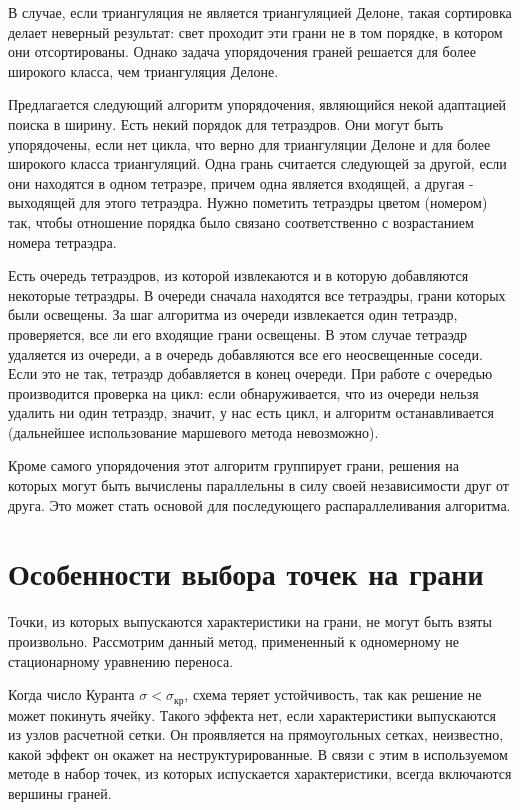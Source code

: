 В случае, если триангуляция не является триангуляцией Делоне, такая сортировка делает неверный результат: свет проходит эти грани не в том порядке, в котором они отсортированы. Однако задача упорядочения граней решается для более широкого класса, чем триангуляция Делоне. 

Предлагается следующий алгоритм упорядочения, являющийся некой адаптацией поиска в ширину. Есть некий порядок для тетраэдров. Они могут быть упорядочены, если нет цикла, что верно для триангуляции Делоне и для более широкого класса триангуляций. Одна грань считается следующей за другой, если они находятся в одном тетраэре, причем одна является входящей, а другая - выходящей для этого тетраэдра. Нужно пометить тетраэдры цветом (номером) так, чтобы отношение порядка было связано соответственно с возрастанием номера тетраэдра. 

Есть очередь тетраэдров, из которой извлекаются и в которую добавляются некоторые тетраэдры. В очереди сначала находятся все тетраэдры, грани которых были освещены. За шаг алгоритма из очереди извлекается один тетраэдр, проверяется, все ли его входящие грани освещены. В этом случае тетраэдр удаляется из очереди, а в очередь добавляются все его неосвещенные соседи. Если это не так, тетраэдр добавляется в конец очереди. При работе с очередью производится проверка на цикл: если обнаруживается, что из очереди нельзя удалить ни один тетраэдр, значит, у нас есть цикл, и алгоритм останавливается (дальнейшее использование маршевого метода невозможно).

Кроме самого упорядочения этот алгоритм группирует грани, решения на которых могут быть вычислены параллельны в силу своей независимости друг от друга. Это может стать основой для последующего распараллеливания алгоритма.
\section{Особенности выбора точек на грани}
Точки, из которых выпускаются характеристики на грани, не могут быть взяты произвольно. Рассмотрим данный метод, примененный к одномерному не стационарному уравнению переноса.

Когда число Куранта $\sigma < \sigma_\text{кр}$, схема теряет устойчивость, так как решение не может покинуть ячейку. Такого эффекта нет, если характеристики выпускаются из узлов расчетной сетки. Он проявляется на прямоугольных сетках, неизвестно, какой эффект он окажет на неструктурированные. В связи с этим в используемом методе в набор точек, из которых испускается характеристики, всегда включаются вершины граней. 
